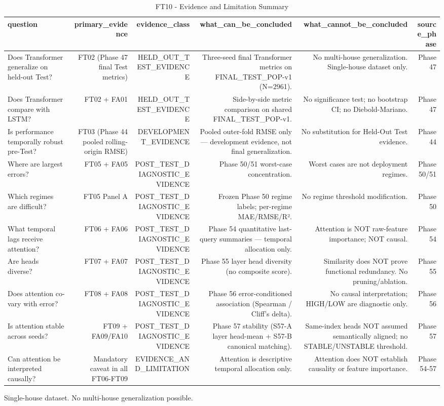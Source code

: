 \begin{table}[h!]
\centering
\caption{FT10 - Evidence and Limitation Summary}
\label{tab:ft10\_-\_evidence\_and\_limitation\_summary}
\begin{tabular}{lrrrrr}
\toprule
question & primary\_evidence & evidence\_class & what\_can\_be\_concluded & what\_cannot\_be\_concluded & source\_phase \\
\midrule
Does Transformer generalize on held-out Test? & FT02 (Phase 47 final Test metrics) & HELD\_OUT\_TEST\_EVIDENCE & Three-seed final Transformer metrics on FINAL\_TEST\_POP-v1 (N=2961). & No multi-house generalization. Single-house dataset only. & Phase 47 \\
Does Transformer compare with LSTM? & FT02 + FA01 & HELD\_OUT\_TEST\_EVIDENCE & Side-by-side metric comparison on shared FINAL\_TEST\_POP-v1. & No significance test; no bootstrap CI; no Diebold-Mariano. & Phase 47 \\
Is performance temporally robust pre-Test? & FT03 (Phase 44 pooled rolling-origin RMSE) & DEVELOPMENT\_EVIDENCE & Pooled outer-fold RMSE only — development evidence, not final generalization. & No substitution for Held-Out Test evidence. & Phase 44 \\
Where are largest errors? & FT05 + FA05 & POST\_TEST\_DIAGNOSTIC\_EVIDENCE & Phase 50/51 worst-case concentration. & Worst cases are not deployment regimes. & Phase 50/51 \\
Which regimes are difficult? & FT05 Panel A & POST\_TEST\_DIAGNOSTIC\_EVIDENCE & Frozen Phase 50 regime labels; per-regime MAE/RMSE/R². & No regime threshold modification. & Phase 50 \\
What temporal lags receive attention? & FT06 + FA06 & POST\_TEST\_DIAGNOSTIC\_EVIDENCE & Phase 54 quantitative last-query summaries — temporal allocation only. & Attention is NOT raw-feature importance; NOT causal. & Phase 54 \\
Are heads diverse? & FT07 + FA07 & POST\_TEST\_DIAGNOSTIC\_EVIDENCE & Phase 55 layer head diversity (no composite score). & Similarity does NOT prove functional redundancy. No pruning/ablation. & Phase 55 \\
Does attention co-vary with error? & FT08 + FA08 & POST\_TEST\_DIAGNOSTIC\_EVIDENCE & Phase 56 error-conditioned association (Spearman / Cliff's delta). & No causal interpretation; HIGH/LOW are diagnostic only. & Phase 56 \\
Is attention stable across seeds? & FT09 + FA09/FA10 & POST\_TEST\_DIAGNOSTIC\_EVIDENCE & Phase 57 stability (S57-A layer head-mean + S57-B canonical matching). & Same-index heads NOT assumed semantically aligned; no STABLE/UNSTABLE threshold. & Phase 57 \\
Can attention be interpreted causally? & Mandatory caveat in all FT06-FT09 & EVIDENCE\_AND\_LIMITATION & Attention is descriptive temporal allocation only. & Attention does NOT establish causality or feature importance. & Phase 54-57 \\
\bottomrule
\end{tabular}
\vspace{4pt}
\footnotesize{Single-house dataset. No multi-house generalization possible.}\\
\end{table}
